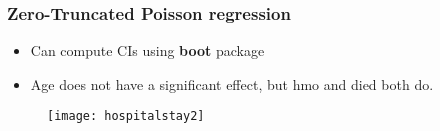 \documentclass[MASTER.tex]{subfiles}
\begin{document}
\begin{frame}
	\frametitle{Zero-Truncated Poisson regression}
	\large
	
	\begin{itemize}
\item Can compute CIs using \textbf{boot} package
\item Age does not have a significant effect, but hmo and died both do.
\end{itemize}
\end{frame}

\begin{frame}
	\begin{figure}
		\centering
		\texttt{[image: hospitalstay2]}
		
	\end{figure}
\end{frame}
\end{document}
